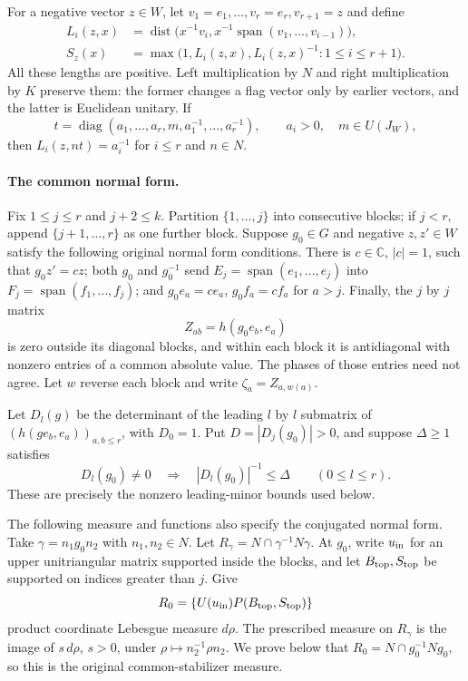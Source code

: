 For a negative vector $z\in W$, let
$v_1=e_1,\ldots,v_r=e_r,v_{r+1}=z$ and define
\begin{align*}
 L_i(z,x)&=\operatorname{dist}\bigl(x^{-1}v_i,
       x^{-1}\operatorname{span}(v_1,\ldots,v_{i-1})\bigr),\\
 S_z(x)&=\max\bigl(1,L_i(z,x),L_i(z,x)^{-1}:1\le i\le r+1\bigr).
\end{align*}
All these lengths are positive.  Left multiplication by $N$ and
right multiplication by $K$ preserve them: the former changes a
flag vector only by earlier vectors, and the latter is Euclidean
unitary.  If
\[
 t=\operatorname{diag}(a_1,\ldots,a_r,m,a_1^{-1},\ldots,a_r^{-1}),
 \qquad a_i>0,\quad m\in U(J_W),
\]
then $L_i(z,nt)=a_i^{-1}$ for $i\le r$ and $n\in N$.

\paragraph{The common normal form.}
Fix $1\le j\le r$ and $j+2\le k$.  Partition
$\{1,\ldots,j\}$ into consecutive blocks; if $j<r$, append
$\{j+1,\ldots,r\}$ as one further block.  Suppose $g_0\in G$
and negative $z,z'\in W$ satisfy the following original normal
form conditions.  There is $c\in\mathbb C$, $|c|=1$, such that
$g_0z'=cz$; both $g_0$ and $g_0^{-1}$ send
$E_j=\operatorname{span}(e_1,\ldots,e_j)$ into
$F_j=\operatorname{span}(f_1,\ldots,f_j)$; and
$g_0e_a=ce_a$, $g_0f_a=cf_a$ for $a>j$.
Finally, the $j$ by $j$ matrix
\[
 Z_{ab}=h(g_0e_b,e_a)
\]
is zero outside its diagonal blocks, and within each block it is
antidiagonal with nonzero entries of a common absolute value.
The phases of those entries need not agree.  Let $w$ reverse
each block and write $\zeta_a=Z_{a,w(a)}$.

Let $D_l(g)$ be the determinant of the leading $l$ by $l$
submatrix of $(h(ge_b,e_a))_{a,b\le r}$, with $D_0=1$.
Put $D=|D_j(g_0)|>0$, and suppose $\Delta\ge1$ satisfies
\[
 D_l(g_0)\ne0\quad\Longrightarrow\quad
              |D_l(g_0)|^{-1}\le\Delta\qquad(0\le l\le r).
\]
These are precisely the nonzero leading-minor bounds used below.

The following measure and functions also specify the conjugated
normal form.  Take $\gamma=n_1g_0n_2$ with $n_1,n_2\in N$.
Let $R_\gamma=N\cap\gamma^{-1}N\gamma$.  At $g_0$, write
$u_{\rm in}$ for an upper unitriangular matrix supported inside
the blocks, and let $B_{\rm top},S_{\rm top}$ be supported on
indices greater than $j$.  Give
\[
 R_0=\{U(u_{\rm in})P(B_{\rm top},S_{\rm top})\}
\]
product coordinate Lebesgue measure $d\rho$.  The prescribed
measure on $R_\gamma$ is the image of $s\,d\rho$, $s>0$,
under $\rho\mapsto n_2^{-1}\rho n_2$.
We prove below that $R_0=N\cap g_0^{-1}Ng_0$, so this is
the original common-stabilizer measure.

